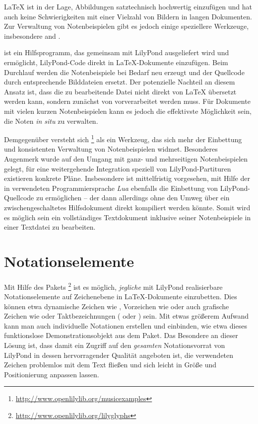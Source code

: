 \documentclass[DIV=12]{scrreprt}
\begin{document}
\LaTeX{} ist in der Lage, Abbildungen satztechnisch hochwertig einzufügen und hat auch keine Schwierigkeiten mit einer Vielzahl von Bildern in langen Dokumenten.
Zur Verwaltung von Notenbeispielen gibt es jedoch einige speziellere Werkzeuge, insbesondere  and .

 ist ein Hilfsprogramm, das gemeinsam mit LilyPond ausgeliefert wird und ermöglicht, LilyPond-Code direkt in \LaTeX-Dokumente einzufügen.
Beim Durchlauf werden die Notenbeispiele bei Bedarf neu erzeugt und der Quellcode durch entsprechende Bilddateien ersetzt.
Der potenzielle Nachteil an diesem Ansatz ist, dass die zu bearbeitende Datei nicht direkt von \LaTeX{} übersetzt werden kann, sondern zunächst von  vorverarbeitet werden muss.
Für Dokumente mit vielen kurzen Notenbeispielen kann es jedoch die effektivste Möglichkeit sein, die Noten \emph{in situ} zu verwalten.

Demgegenüber versteht sich %
\footnote{\url{http://www.openlilylib.org/musicexamples}} 
als ein Werkzeug, das sich mehr der Einbettung und konsistenten Verwaltung von Notenbeispielen widmet.
Besonderes Augenmerk wurde auf den Umgang mit ganz- und mehrseitigen Notenbeispielen gelegt, für eine weitergehende Integration speziell von LilyPond-Partituren existieren konkrete Pläne.
Insbesondere ist mittelfristig vorgesehen, mit Hilfe der in  verwendeten Programmiersprache \emph{Lua} ebenfalls die Einbettung von LilyPond-Quellcode zu ermöglichen -- der dann allerdings ohne den Umweg über ein zwischengeschaltetes Hilfsdokument direkt kompiliert werden könnte.
Somit wird es möglich sein ein vollständiges Textdokument inklusive seiner Notenbeispiele in einer Textdatei zu bearbeiten.

\section{Notationselemente}
\label{sec:pt_notational-elements}
Mit Hilfe des Pakets \lilyglyphs%
\footnote{\url{http://www.openlilylib.org/lilyglyphs}}
ist es möglich, \emph{jegliche} mit LilyPond realisierbare Notationselemente auf Zeichenebene in \LaTeX-Dokumente einzubetten.
Dies können etwa dynamische Zeichen wie , Vorzeichen wie  \flatflat{} oder auch grafische Zeichen wie \crescHairpin{} oder Taktbezeichnungen ( oder \lilyTimeCHalf) sein.
Mit etwas größerem Aufwand kann man auch individuelle Notationen erstellen und einbinden, wie etwa dieses funktionslose \lilyFancyExample{} Demonstrationsobjekt aus dem Paket.
Das Besondere an dieser Lösung ist, dass damit ein Zugriff auf den \emph{gesamten} Notationsvorrat von LilyPond in dessen hervorragender Qualität angeboten ist, die verwendeten Zeichen problemlos mit dem Text fließen und sich leicht in Größe und Positionierung anpassen lassen.
\end{document}
